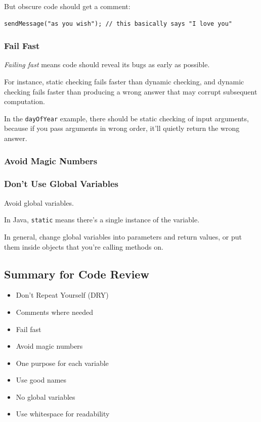 \documentclass[10pt]{amsart}
\begin{document}
\begin{multicols*}{2}
But obscure code should get a comment:
\begin{verbatim}
sendMessage("as you wish"); // this basically says "I love you"
\end{verbatim}

\subsubsection{Fail Fast}

\emph{Failing fast} means code should reveal its bugs as early as possible. 

For instance, static checking fails faster than dynamic checking, and dynamic checking fails faster than producing a wrong answer that may corrupt subsequent computation.

In the \verb|dayOfYear| example, there should be static checking of input arguments, because if you pass arguments in wrong order, it'll quietly return the wrong answer.

\subsubsection{Avoid Magic Numbers}

\subsubsection{Don't Use Global Variables}

Avoid global variables.

In Java, \verb|static| means there's a single instance of the variable.

In general, change global variables into parameters and return values, or put them inside objects that you're calling methods on.


\subsection{Summary for Code Review}

\begin{itemize}
	\item Don't Repeat Yourself (DRY)
	\item Comments where needed
	\item Fail fast
	\item Avoid magic numbers
	\item One purpose for each variable
	\item Use good names
	\item No global variables
	\item Use whitespace for readability
\end{itemize}


\end{multicols*}
\end{document}
